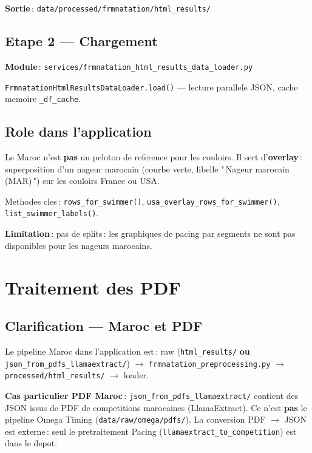 \documentclass[11pt,a4paper]{article}
\begin{document}
\textbf{Sortie}\,: \texttt{data/processed/frmnatation/html\_results/}

\subsection{Etape 2 --- Chargement}

\textbf{Module}\,: \texttt{services/frmnatation\_html\_results\_data\_loader.py}

\texttt{FrmnatationHtmlResultsDataLoader.load()} --- lecture parallele JSON, cache memoire \texttt{\_df\_cache}.

\subsection{Role dans l'application}

Le Maroc n'est \textbf{pas} un peloton de reference pour les couloirs. Il sert d'\textbf{overlay}\,: superposition d'un nageur marocain (courbe verte, libelle "\,Nageur marocain (MAR)\,") sur les couloirs France ou USA.

Methodes cles\,: \texttt{rows\_for\_swimmer()}, \texttt{usa\_overlay\_rows\_for\_swimmer()}, \texttt{list\_swimmer\_labels()}.

\textbf{Limitation}\,: pas de splits\,: les graphiques de pacing par segments ne sont pas disponibles pour les nageurs marocains.

\section{Traitement des PDF}

\subsection{Clarification --- Maroc et PDF}

Le pipeline Maroc dans l'application est\,: raw (\texttt{html\_results/} \textbf{ou} \texttt{json\_from\_pdfs\_llamaextract/}) $\rightarrow$ \texttt{frmnatation\_preprocessing.py} $\rightarrow$ \texttt{processed/html\_results/} $\rightarrow$ loader.

\textbf{Cas particulier PDF Maroc}\,: \texttt{json\_from\_pdfs\_llamaextract/} contient des JSON issus de PDF de competitions marocaines (LlamaExtract). Ce n'est \textbf{pas} le pipeline Omega Timing (\texttt{data/raw/omega/pdfs/}). La conversion PDF $\rightarrow$ JSON est externe\,: seul le pretraitement Pacing (\texttt{llamaextract\_to\_competition}) est dans le depot.
\end{document}
